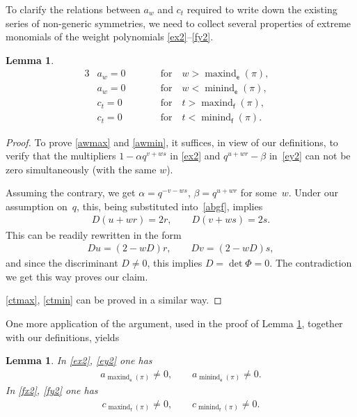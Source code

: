 \documentclass[10pt,a4paper]{amsart}
\numberwithin{equation}{section}
\newtheorem{Lemma}[Theorem]{Lemma}
\begin{document}
To clarify the relations between $a_w$ and $c_t$ required to write down the existing series of non-generic symmetries, we need to collect several properties of extreme monomials of the weight polynomials \eqref{ex2}--\eqref{fy2}.

\begin{Lemma}\label{ac_0}
\begin{alignat}{3}
&a_w=0 \qquad && \text{for} \quad w >\operatorname{maxind}_\mathsf{e}(\pi),&\label{awmax}\\
& a_w =0 \qquad &&\text{for} \quad w <\operatorname{minind}_\mathsf{e}(\pi),&\label{awmin}\\
& c_t =0 \qquad &&\text{for} \quad t >\operatorname{maxind}_\mathsf{f}(\pi),&\label{ctmax}\\
& c_t =0 \qquad && \text{for} \quad t <\operatorname{minind}_\mathsf{f}(\pi). &\label{ctmin}
\end{alignat}
\end{Lemma}

\begin{proof}To prove \eqref{awmax} and \eqref{awmin}, it suffices, in view of our definitions, to verify that the multipliers $1-\alpha q^{v+ws}$ in \eqref{ex2} and $q^{u+wr}-\beta$ in~\eqref{ey2} can not be zero simultaneously (with the same $w$).

Assuming the contrary, we get $\alpha=q^{-v-ws}$, $\beta=q^{u+wr}$ for some~$w$. Under our assumption on~$q$, this, being substituted into~\eqref{abgf}, implies
\begin{gather*}
D(u+wr) =2r, \qquad D(v+ws) =2s.
\end{gather*}
This can be readily rewritten in the form
\begin{gather*}
Du =(2-wD)r,\qquad Dv=(2-wD)s,
\end{gather*}
and since the discriminant $D\ne 0$, this implies $D=\det\Phi=0$. The contradiction we get this way proves our claim.

\eqref{ctmax}, \eqref{ctmin} can be proved in a similar way.
\end{proof}

One more application of the argument, used in the proof of Lemma \ref{ac_0}, together with our definitions, yields

\begin{Lemma}\label{ecnz}
In \eqref{ex2}, \eqref{ey2} one has
\begin{gather*}
a_{\operatorname{maxind}_\mathsf{e}(\pi)}\ne 0,\qquad a_{\operatorname{minind}_\mathsf{e}(\pi)}\ne 0.
\end{gather*}
In \eqref{fx2}, \eqref{fy2} one has
\begin{gather*}
c_{\operatorname{maxind}_\mathsf{f}(\pi)}\ne 0,\qquad c_{\operatorname{minind}_\mathsf{f}(\pi)}\ne 0.
\end{gather*}
\end{Lemma}
\end{document}
